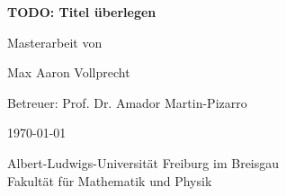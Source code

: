 \documentclass[a4paper, 11pt]{report}
\theoremstyle{definition}
\begin{document}
	\begin{titlepage}

		\centering

		$ $\par

		\vspace{4.5cm}

		\Huge{\textbf{TODO: Titel überlegen}\par}

		\vspace{3cm}

		\large{Masterarbeit von \par}

		\vspace{0.4cm}

		\Large{Max Aaron Vollprecht\par}

		\vspace{0.6cm}

		\large{Betreuer: Prof. Dr. Amador Martin-Pizarro\par}

		\vfill

		\large{\today\par}

		\vspace{0.6cm}

		Albert-Ludwigs-Universität Freiburg im Breisgau\\

		Fakultät für Mathematik und Physik

	\end{titlepage}
	
	\tableofcontents
	\newpage
	
	
    
    \newpage
    \appendix
    
    \newpage
    {}
    
    \newpage
    
\end{document}
